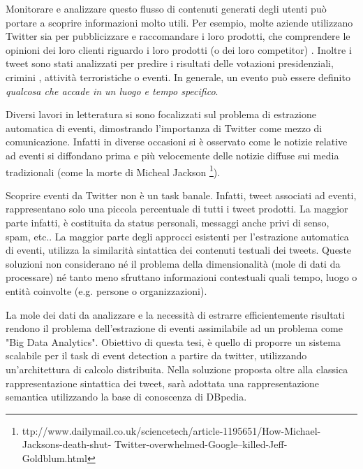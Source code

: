 Monitorare e analizzare questo flusso di  contenuti generati degli utenti può portare a scoprire informazioni molto utili. Per esempio, molte aziende utilizzano Twitter sia per pubblicizzare e raccomandare i loro prodotti, che comprendere  le opinioni dei loro clienti riguardo i loro prodotti (o dei loro competitor) .
Inoltre i tweet sono stati analizzati per predire i risultati delle votazioni presidenziali, crimini \cite{Wang2012}, attività terroristiche o eventi. In generale, un evento può essere definito \emph{qualcosa che accade in un luogo e tempo specifico}. 

Diversi lavori in letteratura si sono focalizzati sul problema di estrazione automatica di eventi, dimostrando l'importanza di Twitter come mezzo di comunicazione. Infatti in diverse occasioni si è osservato come le notizie relative ad eventi si diffondano prima e più velocemente delle notizie diffuse sui media tradizionali (come la morte di Micheal Jackson \footnote{ttp://www.dailymail.co.uk/sciencetech/article-1195651/How-Michael-Jacksons-death-shut- Twitter-overwhelmed-Google–killed-Jeff-Goldblum.html}).

Scoprire eventi da Twitter non è un task banale. Infatti, tweet associati ad  eventi, rappresentano solo una piccola percentuale di tutti i tweet prodotti. La maggior parte infatti, è costituita da status personali, messaggi anche privi di senso, spam, etc..   
La maggior parte degli approcci esistenti per l'estrazione automatica di eventi, utilizza la similarità sintattica dei contenuti testuali dei tweets. Queste soluzioni non considerano né il problema della dimensionalità (mole di dati da processare) né tanto meno sfruttano informazioni contestuali quali tempo, luogo o entità coinvolte (e.g. persone o organizzazioni).

La mole dei dati da analizzare e la necessità di estrarre efficientemente risultati rendono il problema dell'estrazione di eventi assimilabile ad un problema  come  "Big Data Analytics".  
Obiettivo di questa tesi, è quello di proporre un sistema scalabile per il task di event detection a partire da twitter, utilizzando un'architettura di calcolo distribuita. Nella soluzione proposta oltre alla classica rappresentazione sintattica dei tweet, sarà adottata una rappresentazione semantica utilizzando la base di conoscenza di DBpedia.


